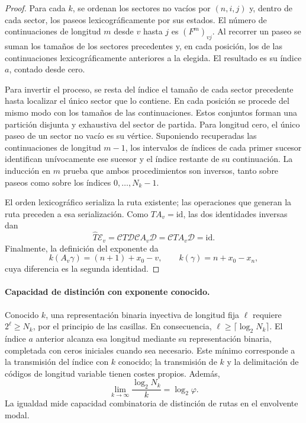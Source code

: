 \begin{proof}
Para cada \(k\), se ordenan los sectores no vacíos por \((n,i,j)\)
y, dentro de cada sector, los paseos lexicográficamente por sus
estados. El número de continuaciones de longitud \(m\) desde
\(v\) hasta \(j\) es \((F^m)_{vj}\). Al recorrer un paseo se suman
los tamaños de los sectores precedentes y, en cada posición, los
de las continuaciones lexicográficamente anteriores a la elegida.
El resultado es su índice \(a\), contado desde cero.

Para invertir el proceso, se resta del índice el tamaño de cada
sector precedente hasta localizar el único sector que lo contiene.
En cada posición se procede del mismo modo con los tamaños de
las continuaciones. Estos conjuntos forman una partición disjunta
y exhaustiva del sector de partida. Para longitud cero, el único
paseo de un sector no vacío es su vértice. Suponiendo recuperadas
las continuaciones de longitud \(m-1\), los intervalos de índices
de cada primer sucesor identifican unívocamente ese sucesor y el
índice restante de su continuación. La inducción en \(m\) prueba
que ambos procedimientos son inversos, tanto sobre paseos como
sobre los índices \(0,\ldots,N_k-1\).

El orden lexicográfico serializa la ruta existente; las operaciones
que generan la ruta preceden a esa serialización.
Como \(T A_v=\mathrm{id}\), las dos identidades inversas dan
\[
 \widehat T\mathcal E_v
 =\mathcal C T\mathcal D\mathcal C A_v\mathcal D
 =\mathcal C T A_v\mathcal D
 =\mathrm{id}.
\]
Finalmente, la definición del exponente da
\[
 k(A_v\gamma)=(n+1)+x_0-v,\qquad
 k(\gamma)=n+x_0-x_n,
\]
cuya diferencia es la segunda identidad.
\end{proof}

\paragraph{Capacidad de distinción con exponente conocido.}
Conocido \(k\), una representación binaria inyectiva de longitud
fija \(\ell\) requiere \(2^\ell\geq N_k\), por el principio de
las casillas. En consecuencia,
\(\ell\geq\lceil\log_2N_k\rceil\).
El índice \(a\) anterior alcanza esa longitud mediante su
representación binaria, completada con ceros iniciales cuando sea
necesario. Este mínimo corresponde a la transmisión del índice
con \(k\) conocido; la transmisión de \(k\) y la delimitación de
códigos de longitud variable tienen costes propios. Además,
\[
 \lim_{k\to\infty}\frac{\log_2N_k}{k}=\log_2\varphi.
\]
La igualdad mide capacidad combinatoria de distinción de rutas
en el envolvente modal.


